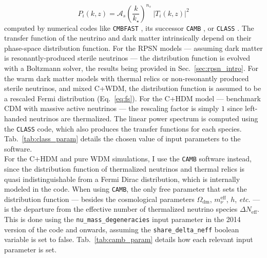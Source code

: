 \begin{equation}
P_i(k,z) = \mathcal{A}_s \left(\frac{k}{k_\star} \right)^{n_s} ~\left\vert T_i(k,z) \right\vert^2
\end{equation}
computed by numerical codes like \texttt{CMBFAST} \citep{Seljak1996}, its successor
\texttt{CAMB} \citep{Lewis2000}, or \texttt{CLASS} \citep{CLASS}. The transfer function of the neutrino and dark matter intrinsically depend on their phase-space distribution function. For the RPSN models --- assuming dark matter is resonantly-produced sterile neutrinos --- the distribution function is evolved with a Boltzmann solver, the results being provided in Sec.~\ref{sec:rpsn_intro}. For the warm dark matter models with thermal relics or non-resonantly produced sterile neutrinos, and mixed C+WDM, the distribution function is assumed to be a rescaled Fermi distribution (Eq.~\ref{eq:fs}). For the C+HDM model --- benchmark CDM with massive active neutrinos --- the rescaling factor is simply $1$ since left-handed neutrinos are thermalized. The linear power spectrum is computed using the \texttt{CLASS} code, which also produces the transfer functions for each species. Tab.~\ref{tab:class_param} details the chosen value of input parameters to the software. \\

For the C+HDM and pure WDM simulations, I use the \texttt{CAMB} software instead, since the distribution function of thermalized neutrinos and thermal relics is quasi indistinguishable from a Fermi Dirac distribution, which is internally modeled in the code. When using \texttt{CAMB}, the only free parameter that sets the distribution function --- besides the cosmological parameters $\Omega_{\mathrm{dm}}$, $m_\nu^{\mathrm{eff}}$, $h$, \textit{etc.} --- is the departure from the effective number of thermalized neutrino species $\Delta N_{\mathrm{eff}}$. This is done using the \texttt{nu\_mass\_degeneracies} input parameter in the 2014 version of the code and onwards, assuming the \texttt{share\_delta\_neff} boolean variable is set to false. Tab.~\ref{tab:camb_param} details how each relevant input parameter is set. \\

